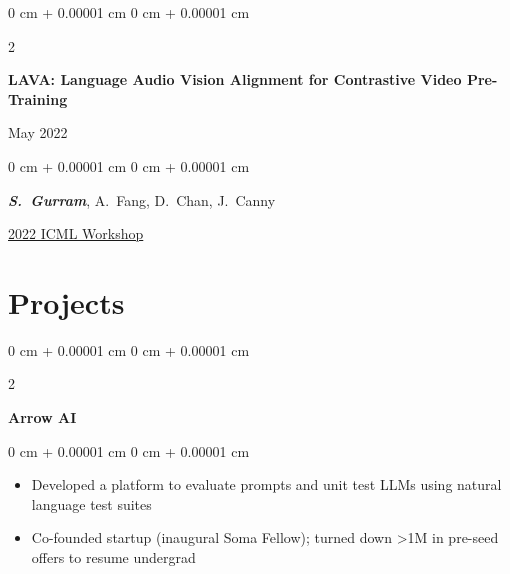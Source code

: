 \documentclass[10pt, letterpaper]{article}
\newenvironment{highlights}{
    \begin{itemize}[
        topsep=0.10 cm,
        parsep=0.10 cm,
        partopsep=0pt,
        itemsep=0pt,
        leftmargin=0 cm + 10pt
    ]
}{
    \end{itemize}
} %
\newenvironment{onecolentry}{
    \begin{adjustwidth}{
        0 cm + 0.00001 cm
    }{
        0 cm + 0.00001 cm
    }
}{
    \end{adjustwidth}
} %
\newenvironment{twocolentry}[2][]{
    \onecolentry
    \def\secondColumn{#2}
    \setcolumnwidth{\fill, 4.5 cm}
    \begin{paracol}{2}
}{
    \switchcolumn \raggedleft \secondColumn
    \end{paracol}
    \endonecolentry
} %
\begin{document}
        \begin{samepage}
            \begin{twocolentry}{
                May 2022
            }
                \textbf{LAVA: Language Audio Vision Alignment for Contrastive Video Pre-Training}
            \end{twocolentry}

            \vspace{0.10 cm}
            
            \begin{onecolentry}
                \mbox{\textbf{\textit{S. Gurram}}}, \mbox{A. Fang}, \mbox{D. Chan}, \mbox{J. Canny}
                \vspace{0.10 cm}
                
        \href{https://arxiv.org/abs/2207.08024}{2022 ICML Workshop}
        \end{onecolentry}
        \end{samepage}

    
    \section{Projects}



        
        \begin{twocolentry}{
        }
            \textbf{Arrow AI}\end{twocolentry}

        \vspace{0.10 cm}
        \begin{onecolentry}
            \begin{highlights}
                \item Developed a platform to evaluate prompts and unit test LLMs using natural language test suites
                \item Co-founded startup (inaugural Soma Fellow); turned down >1M in pre-seed offers to resume undergrad
            \end{highlights}
        \end{onecolentry}
\end{document}
